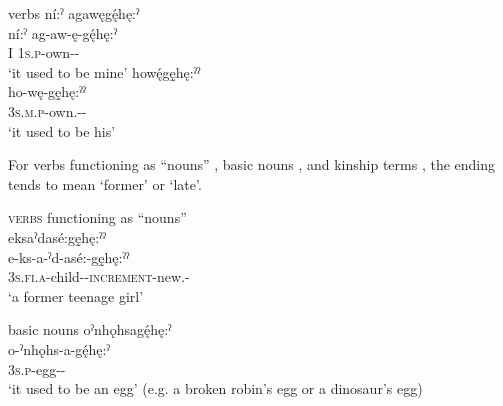 \ea\label{ex:gehex} verbs
\ea ní:ˀ agawęgę́hę:ˀ\\
\gll ní:ˀ ag-aw-ę-gę́hę:ˀ\\
 I \textsc{1s.p}-own-{\stative}-{\past}\\
\glt  ‘it used to be mine’
\newpage
\ex howę́gę̱hę:ˀˀ \\
\gll ho-wę-gę̱hę:ˀˀ\\
\textsc{3s.m.p}-own.{\stative}-{\stative}-{\past}\footnotemark{}\\
 \glt ‘it used to be his’
\z
\z

For verbs functioning as “nouns” , basic nouns , and kinship terms , the  ending tends to mean ‘former’ or ‘late’.

\ea\label{ex:gehex30} \textsc{verbs} functioning as “nouns”\\
eksaˀdasé:gę̱hę:ˀˀ\\
\gll e-ks-a-ˀd-asé:-gę̱hę:ˀˀ\\
 \textsc{3s.fi.a}-child-{\joinerA}-\textsc{increment}-new.{\stative}-{\past}\\
\glt `a former teenage girl'
\z


\ea\label{ex:gehex2} basic nouns
\ea oˀnhǫhsagę́hę:ˀ \\
\gll o-ˀnhǫhs-a-gę́hę:ˀ \\
\textsc{3s.p}-egg-{\joinerA}-{\past}\\
\glt ‘it used to be an egg’ (e.g. a broken robin’s egg or a dinosaur’s egg)

